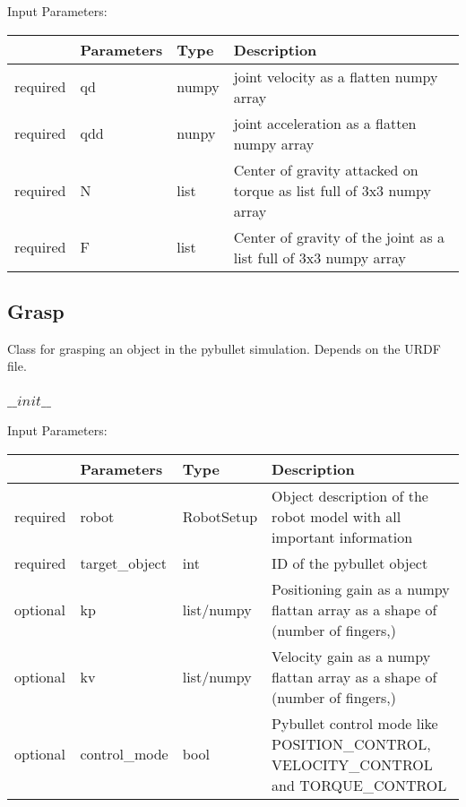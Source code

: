 \documentclass[
	ngerman,
	accentcolor=9c,%
	type=intern,
	marginpar=false
	]{tudapub}
\begin{document}
\vspace{0.5cm}
\noindent Input Parameters:
\vspace{0.5cm}

\begin{tabular}{|p{}|p{}|p{}| p{}|}
\hline
 & \textbf{Parameters} & \textbf{Type} & \textbf{Description} \\
\hline
required & qd & numpy &    joint velocity as a flatten numpy array\\
\hline
required & qdd & nunpy & joint acceleration as a flatten numpy array\\
\hline
required & N & list & Center of gravity attacked on torque as list full of 3x3 numpy array\\
\hline
required & F & list & Center of gravity of the joint as a list full of 3x3 numpy array \\
\hline
\end{tabular}
\vspace{1cm}




\subsection{Grasp}
\noindent Class for grasping an object in the pybullet simulation. Depends on the URDF file.

\vspace{0.5cm}

\subsubsection{$\_\_init\_\_$}
\noindent Input Parameters:
\vspace{0.5cm}


\begin{tabular}{|p{}|p{}|p{}| p{}|}
\hline
 & \textbf{Parameters} & \textbf{Type} & \textbf{Description} \\
\hline
required & robot & RobotSetup & Object description of the robot model with all important information \\
\hline
required & target\_object & int & ID of the pybullet object \\
\hline
optional & kp & list/numpy & Positioning gain as a numpy flattan array as a shape of (number of fingers,) \\
\hline
optional & kv & list/numpy & Velocity gain as a numpy flattan array as a shape of (number of fingers,) \\
\hline
optional & control\_mode & bool & Pybullet control mode like POSITION\_CONTROL, VELOCITY\_CONTROL and TORQUE\_CONTROL \\
\hline
\end{tabular}
\vspace{0.5cm}
\end{document}
